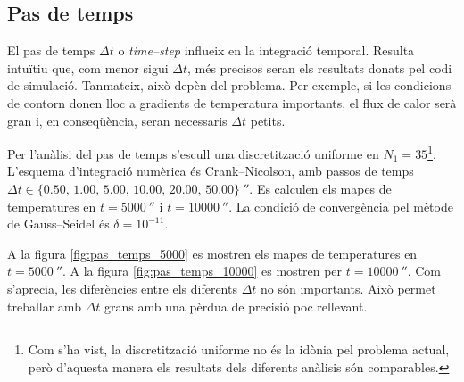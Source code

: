 
\subsection{Pas de temps} \label{sec:analisi_pas_de_temps}

El pas de temps $\Delta t$ o \emph{time--step} influeix en la integració temporal. Resulta intuïtiu que, com menor sigui $\Delta t$, més precisos seran els resultats donats pel codi de simulació. Tanmateix, això depèn del problema. Per exemple, si les condicions de contorn donen lloc a gradients de temperatura importants, el flux de calor serà gran i, en conseqüència, seran necessaris $\Delta t$ petits. 

Per l'anàlisi del pas de temps s'escull una discretització uniforme en $N_1 = 35$\footnote{Com s'ha vist, la discretització uniforme no és la idònia pel problema actual, però d'aquesta manera els resultats dels diferents anàlisis són comparables.}. L'esquema d'integració numèrica és Crank--Nicolson, amb passos de temps $\Delta t \in \{ 0.50, \, 1.00, \, 5.00, \, 10.00, \, 20.00, \, 50.00 \} \ \second$. Es calculen els mapes de temperatures en $t = 5000 \ \second$ i $t = 10000 \ \second$. La condició de convergència pel mètode de Gauss--Seidel és $\delta = 10^{-11}$. 

A la figura \ref{fig:pas_temps_5000} es mostren els mapes de temperatures en $t = 5000 \ \second$. A la figura \ref{fig:pas_temps_10000} es mostren per $t = 10000 \ \second$. Com s'aprecia, les diferències entre els diferents $\Delta t$ no són importants. Això permet treballar amb $\Delta t$ grans amb una pèrdua de precisió poc rellevant.
 
